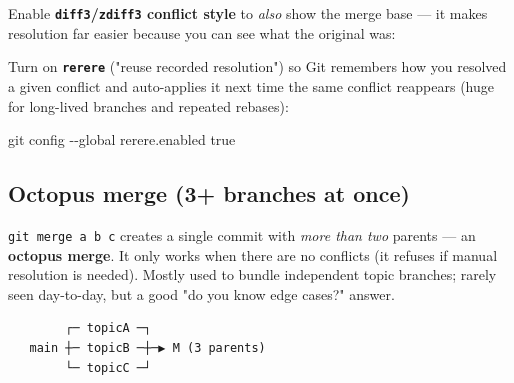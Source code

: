 \documentclass[11pt]{article}
\newenvironment{Shaded}{\begin{snugshade}}{\end{snugshade}}
\newcommand{\AttributeTok}[1]{\textcolor[rgb]{0.16,0.50,0.73}{#1}}
\newcommand{\CommentTok}[1]{\textcolor[rgb]{0.48,0.49,0.49}{#1}}
\newcommand{\ExtensionTok}[1]{\textcolor[rgb]{0.00,0.60,1.00}{\textbf{#1}}}
\newcommand{\FunctionTok}[1]{\textcolor[rgb]{0.56,0.27,0.68}{#1}}
\newcommand{\KeywordTok}[1]{\textcolor[rgb]{0.81,0.81,0.76}{\textbf{#1}}}
\newcommand{\NormalTok}[1]{\textcolor[rgb]{0.81,0.81,0.76}{#1}}
\newcommand{\OperatorTok}[1]{\textcolor[rgb]{0.81,0.81,0.76}{#1}}
\begin{document}
Enable \textbf{\texttt{diff3}/\texttt{zdiff3} conflict style} to \emph{also} show the merge base --- it makes resolution far easier because you can see what the original was:


\begin{Shaded}
\end{Shaded}

Turn on \textbf{\texttt{rerere}} ("reuse recorded resolution") so Git remembers how you resolved a given conflict and auto-applies it next time the same conflict reappears (huge for long-lived branches and repeated rebases):


\begin{Shaded}
\begin{Highlighting}[]
\FunctionTok{git}\NormalTok{ config }\AttributeTok{{-}{-}global}\NormalTok{ rerere.enabled true}
\end{Highlighting}
\end{Shaded}

\subsection{Octopus merge (3+ branches at once)}\label{octopus-merge-3-branches-at-once}

\texttt{git\ merge\ a\ b\ c} creates a single commit with \emph{more than two} parents --- an \textbf{octopus merge}. It only works when there are no conflicts (it refuses if manual resolution is needed). Mostly used to bundle independent topic branches; rarely seen day-to-day, but a good "do you know edge cases?" answer.

\setcodelang{}

\begin{verbatim}
        ┌─ topicA ─┐
   main ┼─ topicB ─┼─▶ M (3 parents)
        └─ topicC ─┘
\end{verbatim}
\end{document}

